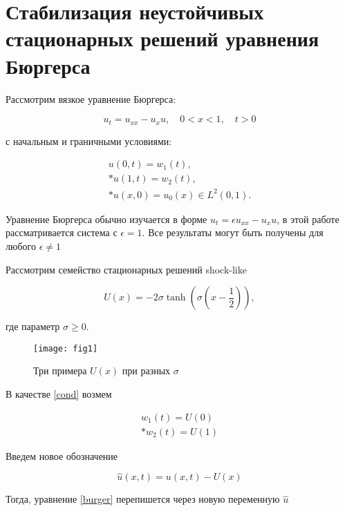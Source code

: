 \section{Стабилизация неустойчивых стационарных решений уравнения Бюргерса}
\vspace{1em}

Рассмотрим вязкое уравнение Бюргерса:

\begin{equation}\label{burger}
  u_t = u_{xx} - u_x u, \quad 0 < x < 1, \quad t > 0
\end{equation}

с начальным и граничными условиями:

\begin{gather}\label{cond}
  u(0, t) = w_1(t), \\*
  u(1, t) = w_2(t), \\*
  u(x, 0) = u_{0}(x) \in L^2(0, 1). \nonumber
\end{gather}

\begin{remark}
Уравнение Бюргерса обычно изучается в форме $u_t = \epsilon u_{xx} - u_xu$, в этой работе рассматривается система с $\epsilon = 1$. Все результаты могут быть получены для любого $\epsilon \ne 1$
\end{remark}

Рассмотрим семейство стационарных решений shock-like

\begin{equation}\label{shock_like}
  U(x) = -2\sigma\tanh{(\sigma(x - \frac{1}{2}))},
\end{equation}

где параметр $\sigma \ge 0$.

\begin{figure}[H]
  \centering
  \texttt{[image: fig1]}
  \caption{Три примера $U(x)$ при разных $\sigma$}
\end{figure}

В качестве \eqref{cond} возмем

\begin{gather}\label{cond2}
  w_1(t) = U(0) \\*
  w_2(t) = U(1)
\end{gather}

Введем новое обозначение

\begin{equation}
  \hat{u}(x, t) = u(x, t) - U(x)
\end{equation}

Тогда, уравнение \eqref{burger} перепишется через новую переменную $\hat{u}$

